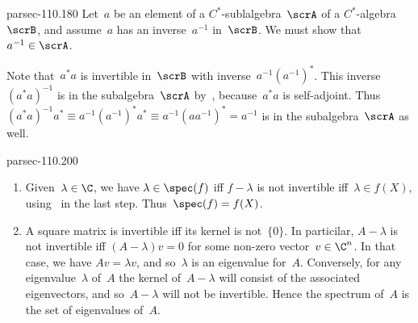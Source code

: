 \documentclass[b5page]{book}
\begin{document}
\begin{solution}{parsec-110.180}
Let~$a$ be an element of a $C^*$-sublalgebra~$\scrA$
of a $C^*$-algebra~$\scrB$,
    and assume~$a$ has an inverse~$a^{-1}$ in~$\scrB$.
    We must show that~$a^{-1}\in\scrA$.

Note that~$a^*a$ is invertible in~$\scrB$
    with inverse~$a^{-1} (a^{-1})^*$.
This inverse
$(a^*a)^{-1}$ is in the subalgebra~$\scrA$
by~,
because~$a^*a$ is self-adjoint.
    Thus~$(a^*a)^{-1}a^*\equiv a^{-1} (a^{-1})^* a^*
    \equiv a^{-1} (aa^{-1})^* = a^{-1}$
    is in the subalgebra~$\scrA$ as well.
\end{solution}
\begin{solution}{parsec-110.200}
\begin{enumerate}
    \item
Given~$\lambda\in\C$, we have
        $\lambda \in \spec(f)$
        iff $f-\lambda$ is not invertible
        iff~$\lambda \in f(X)$,
using~ in the last step.
        Thus~$\spec(f)=f(X)$.
    \item
        A square matrix is invertible iff its kernel is not~$\{0\}$.
In particilar, $A-\lambda$
        is not invertible iff $(A-\lambda)v=0$
        for some non-zero vector~$v\in \C^n$.
In that case, we have $Av=\lambda v$, and so~$\lambda$
is an eigenvalue for~$A$.  Conversely,
for any eigenvalue~$\lambda$ of~$A$
the kernel of~$A-\lambda$ will consist
of the associated eigenvectors, and so~$A-\lambda$ will not be invertible.
Hence the spectrum of~$A$ 
is the set of eigenvalues of~$A$.
\end{enumerate}
\end{solution}
\end{document}
